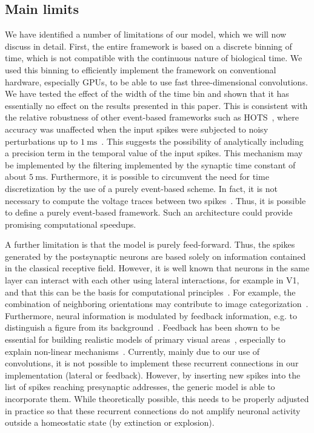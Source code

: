 \documentclass[default]{sn-jnl}%
\theoremstyle{thmstyleone}%
\theoremstyle{thmstyletwo}%
\theoremstyle{thmstylethree}%
\newcommand{\ms}{\si{\milli\second}}%
\newcommand{\note}[1]{{\sethlcolor{yellow}\hl{#1}}}
\begin{document}
\subsection{Main limits}
We have identified a number of limitations of our model, which we will now discuss in detail. First, the entire framework is based on a discrete binning of time, which is not compatible with the continuous nature of biological time. We used this binning to efficiently implement the framework on conventional hardware, especially GPUs, to be able to use fast three-dimensional convolutions. We have tested the effect of the width of the time bin and shown that it has essentially no effect on the results presented in this paper. This is consistent with the relative robustness of other event-based frameworks such as HOTS~\citep{lagorce_hots_2017}, where accuracy was unaffected when the input spikes were subjected to noisy perturbations up to $1~\ms$~\citep{grimaldi_robust_2022}. This suggests the possibility of analytically including a precision term in the temporal value of the input spikes. This mechanism may be implemented by the filtering implemented by the synaptic time constant of about $5~\ms$. Furthermore, it is possible to circumvent the need for time discretization by the use of a purely event-based scheme. In fact, it is not necessary to compute the voltage traces between two spikes~\citep{hanuschkin_general_2010}. Thus, it is possible to define a purely event-based framework. Such an architecture could provide promising computational speedups. %

A further limitation is that the model is purely feed-forward. Thus, the spikes generated by the postsynaptic neurons are based solely on information contained in the classical receptive field. However, it is well known that neurons in the same layer can interact with each other using lateral interactions, for example in V1, and that this can be the basis for computational principles~\citep{chavane_revisiting_2022}. For example, the combination of neighboring orientations may contribute to image categorization~\citep{perrinet_edge_2015}. Furthermore, neural information is modulated by feedback information, e.g. to distinguish a figure from its background~\citep{roelfsema_early_2016}. Feedback has been shown to be essential for building realistic models of primary visual areas~\citep{boutin_sparse_2020, boutin_effect_2020}, especially to explain non-linear mechanisms~\citep{boutin_pooling_2022}. Currently, mainly due to our use of convolutions, it is not possible to implement these recurrent connections in our implementation (lateral or feedback). However, by inserting new spikes into the list of spikes reaching presynaptic addresses, the generic model is able to incorporate them. While theoretically possible, this needs to be properly adjusted in practice so that these recurrent connections do not amplify neuronal activity outside a homeostatic state (by extinction or explosion).
\end{document}
